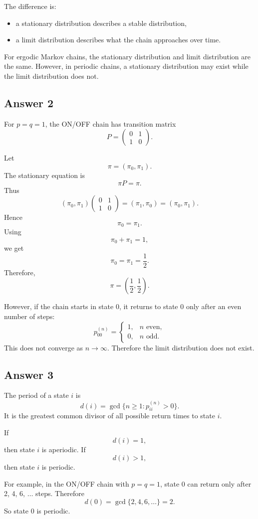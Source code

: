 \documentclass[12pt,a4paper]{article}
\theoremstyle{lecturestyle}
\begin{document}
The difference is:
\begin{itemize}[leftmargin=1.2cm]
    \item a stationary distribution describes a stable distribution,
    \item a limit distribution describes what the chain approaches over time.
\end{itemize}

For ergodic Markov chains, the stationary distribution and limit distribution are the same. However, in periodic chains, a stationary distribution may exist while the limit distribution does not.

\subsection*{Answer 2}

For $p=q=1$, the ON/OFF chain has transition matrix
\[
P=
\begin{pmatrix}
0 & 1\\
1 & 0
\end{pmatrix}.
\]

Let
\[
\pi=(\pi_0,\pi_1).
\]
The stationary equation is
\[
\pi P=\pi.
\]
Thus
\[
(\pi_0,\pi_1)
\begin{pmatrix}
0 & 1\\
1 & 0
\end{pmatrix}
=
(\pi_1,\pi_0)
=
(\pi_0,\pi_1).
\]
Hence
\[
\pi_0=\pi_1.
\]
Using
\[
\pi_0+\pi_1=1,
\]
we get
\[
\pi_0=\pi_1=\frac12.
\]
Therefore,
\[
\pi=\left(\frac12,\frac12\right).
\]

However, if the chain starts in state 0, it returns to state 0 only after an even number of steps:
\[
p_{00}^{(n)}
=
\begin{cases}
1, & n\text{ even},\\
0, & n\text{ odd}.
\end{cases}
\]
This does not converge as $n\to\infty$. Therefore the limit distribution does not exist.

\subsection*{Answer 3}

The period of a state $i$ is
\[
d(i)=\gcd\{n\geq1:p_{ii}^{(n)}>0\}.
\]
It is the greatest common divisor of all possible return times to state $i$.

If
\[
d(i)=1,
\]
then state $i$ is aperiodic. If
\[
d(i)>1,
\]
then state $i$ is periodic.

For example, in the ON/OFF chain with $p=q=1$, state 0 can return only after 2, 4, 6, $\ldots$ steps. Therefore
\[
d(0)=\gcd\{2,4,6,\ldots\}=2.
\]
So state 0 is periodic.
\end{document}
